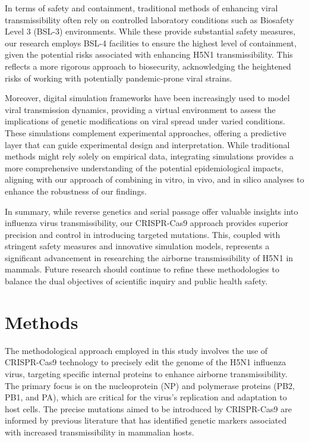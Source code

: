 \documentclass{article}
\begin{document}
In terms of safety and containment, traditional methods of enhancing viral transmissibility often rely on controlled laboratory conditions such as Biosafety Level 3 (BSL-3) environments. While these provide substantial safety measures, our research employs BSL-4 facilities to ensure the highest level of containment, given the potential risks associated with enhancing H5N1 transmissibility. This reflects a more rigorous approach to biosecurity, acknowledging the heightened risks of working with potentially pandemic-prone viral strains.

Moreover, digital simulation frameworks have been increasingly used to model viral transmission dynamics, providing a virtual environment to assess the implications of genetic modifications on viral spread under varied conditions. These simulations complement experimental approaches, offering a predictive layer that can guide experimental design and interpretation. While traditional methods might rely solely on empirical data, integrating simulations provides a more comprehensive understanding of the potential epidemiological impacts, aligning with our approach of combining in vitro, in vivo, and in silico analyses to enhance the robustness of our findings.

In summary, while reverse genetics and serial passage offer valuable insights into influenza virus transmissibility, our CRISPR-Cas9 approach provides superior precision and control in introducing targeted mutations. This, coupled with stringent safety measures and innovative simulation models, represents a significant advancement in researching the airborne transmissibility of H5N1 in mammals. Future research should continue to refine these methodologies to balance the dual objectives of scientific inquiry and public health safety.

\section{Methods}
The methodological approach employed in this study involves the use of CRISPR-Cas9 technology to precisely edit the genome of the H5N1 influenza virus, targeting specific internal proteins to enhance airborne transmissibility. The primary focus is on the nucleoprotein (NP) and polymerase proteins (PB2, PB1, and PA), which are critical for the virus's replication and adaptation to host cells. The precise mutations aimed to be introduced by CRISPR-Cas9 are informed by previous literature that has identified genetic markers associated with increased transmissibility in mammalian hosts.
\end{document}
